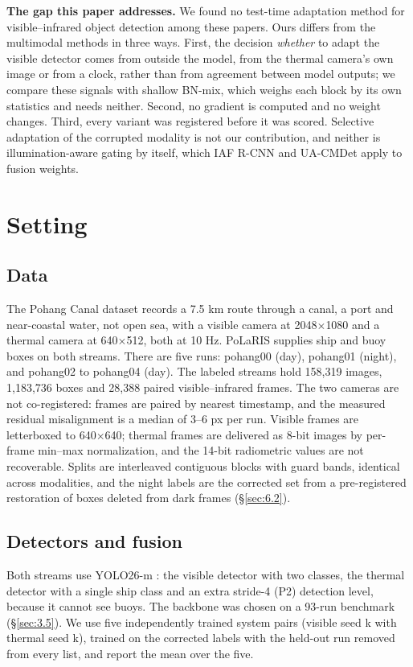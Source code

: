 \documentclass[10pt]{article}
\begin{document}
\textbf{The gap this paper addresses.} We found no test-time adaptation method for visible--infrared object detection among these papers. Ours differs from the multimodal methods in three ways. First, the decision \emph{whether} to adapt the visible detector comes from outside the model, from the thermal camera's own image or from a clock, rather than from agreement between model outputs; we compare these signals with shallow BN-mix, which weighs each block by its own statistics and needs neither. Second, no gradient is computed and no weight changes. Third, every variant was registered before it was scored. Selective adaptation of the corrupted modality is not our contribution, and neither is illumination-aware gating by itself, which IAF R-CNN and UA-CMDet apply to fusion weights.

\section{Setting}\label{sec:3}
\subsection{Data}\label{sec:3.1}
The Pohang Canal dataset \citep{chung2023pohang} records a 7.5 km route through a canal, a port and near-coastal water, not open sea, with a visible camera at 2048$\times$1080 and a thermal camera at 640$\times$512, both at 10 Hz. PoLaRIS \citep{choi2025polaris} supplies ship and buoy boxes on both streams. There are five runs: pohang00 (day), pohang01 (night), and pohang02 to pohang04 (day). The labeled streams hold 158,319 images, 1,183,736 boxes and 28,388 paired visible--infrared frames. The two cameras are not co-registered: frames are paired by nearest timestamp, and the measured residual misalignment is a median of 3--6 px per run. Visible frames are letterboxed to 640$\times$640; thermal frames are delivered as 8-bit images by per-frame min--max normalization, and the 14-bit radiometric values are not recoverable. Splits are interleaved contiguous blocks with guard bands, identical across modalities, and the night labels are the corrected set from a pre-registered restoration of boxes deleted from dark frames (\S\ref{sec:6.2}).

\subsection{Detectors and fusion}\label{sec:3.2}
Both streams use YOLO26-m \citep{jocher2026ultralytics}: the visible detector with two classes, the thermal detector with a single ship class and an extra stride-4 (P2) detection level, because it cannot see buoys. The backbone was chosen on a 93-run benchmark (\S\ref{sec:3.5}). We use five independently trained system pairs (visible seed k with thermal seed k), trained on the corrected labels with the held-out run removed from every list, and report the mean over the five.
\end{document}
